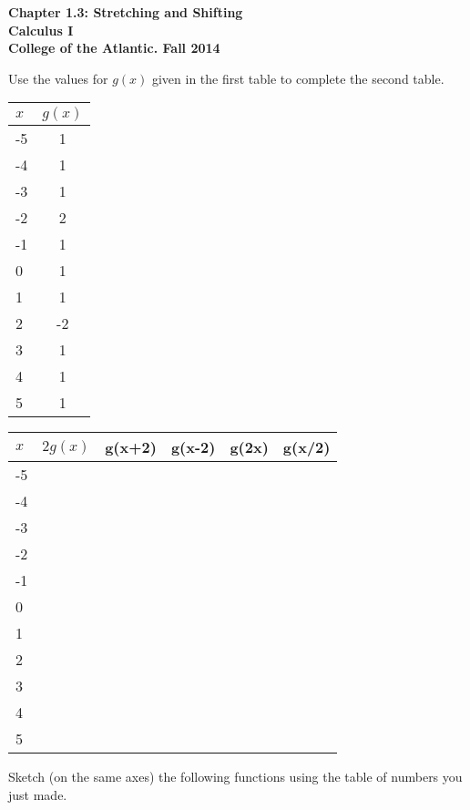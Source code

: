 \documentclass[12pt]{article}
\begin{document}
\pagestyle{empty}
\begin{center}
{\Large {\bf Chapter 1.3: Stretching and Shifting}}\\
\medskip
{\large {\bf Calculus I}}\\
\medskip
{\bf College of the Atlantic.  Fall 2014}\\
\end{center}


\noindent Use the values for $g(x)$ given in the first table to
complete the second table.  

\begin{center}
\begin{tabular}{|| l | c ||}
\hline $x$ & $g(x)$ \\
\hline 
-5 & 1\\
-4 & 1\\
-3 & 1\\
-2 & 2\\
-1 & 1\\
0 & 1\\
1 & 1\\
2 & -2\\
3 & 1\\
4 & 1\\
5 & 1\\
\hline 
\end{tabular}
\end{center}

\begin{center}
\begin{tabular}{|| l | c |c|c|c|c||}
\hline $x$ & $2g(x)$ & g(x+2) & g(x-2)& g(2x) & g(x/2) \\
\hline
-5 &  & & & & \\
-4 &  & & & & \\
-3 &  & & & & \\
-2 &  & & & & \\
-1 &  & & & & \\
0 &  & & & & \\
1 &  & & & & \\
2 &  & & & & \\
3 &  & & & & \\
4 &  & & & & \\
5 &  & & & & \\
\hline 
\end{tabular}
\end{center}
Sketch (on the same axes) the following functions using the table of
numbers you just made. 
\end{document}
